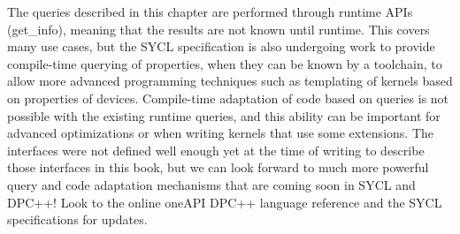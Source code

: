 The queries described in this chapter are performed through runtime APIs (get\_info), meaning that the results are not known until runtime. This covers many use cases, but the SYCL specification is also undergoing work to provide compile-time querying of properties, when they can be known by a toolchain, to allow more advanced programming techniques such as templating of kernels based on properties of devices. Compile-time adaptation of code based on queries is not possible with the existing runtime queries, and this ability can be important for advanced optimizations or when writing kernels that use some extensions. The interfaces were not defined well enough yet at the time of writing to describe those interfaces in this book, but we can look forward to much more powerful query and code adaptation mechanisms that are coming soon in SYCL and DPC++! Look to the online oneAPI DPC++ language reference and the SYCL specifications for updates.\par
